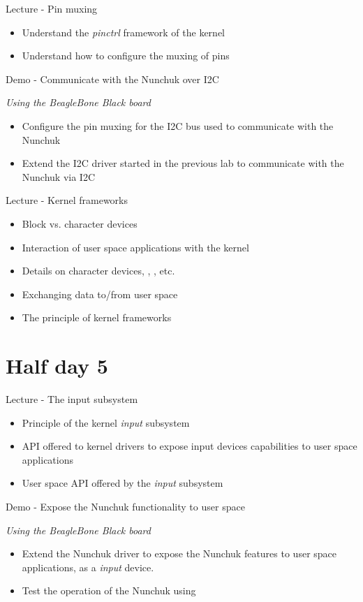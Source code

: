 \documentclass[a4paper,12pt,obeyspaces,spaces,hyphens]{article}
\begin{document}
\feagendatwocolumn
{Lecture - Pin muxing}
{
  \begin{itemize}
  \item Understand the {\em pinctrl} framework of the kernel
  \item Understand how to configure the muxing of pins
  \end{itemize}
}
{Demo - Communicate with the Nunchuk over I2C}
{
  {\em Using the BeagleBone Black board}
  \begin{itemize}
  \item Configure the pin muxing for the I2C bus used to communicate
    with the Nunchuk
  \item Extend the I2C driver started in the previous lab to
    communicate with the Nunchuk via I2C
  \end{itemize}
}

\feagendaonecolumn
{Lecture - Kernel frameworks}
{
  \begin{itemize}
  \item Block vs. character devices
  \item Interaction of user space applications with the kernel
  \item Details on character devices, , , etc.
  \item Exchanging data to/from user space
  \item The principle of kernel frameworks
  \end{itemize}
}

\section{Half day 5}

\feagendatwocolumn
{Lecture - The input subsystem}
{
  \begin{itemize}
  \item Principle of the kernel {\em input} subsystem
  \item API offered to kernel drivers to expose input devices
    capabilities to user space applications
  \item User space API offered by the {\em input} subsystem
  \end{itemize}
}
{Demo - Expose the Nunchuk functionality to user space}
{
  {\em Using the BeagleBone Black board}
  \begin{itemize}
  \item Extend the Nunchuk driver to expose the Nunchuk features to
    user space applications, as a {\em input} device.
  \item Test the operation of the Nunchuk using 
  \end{itemize}
}
\end{document}
